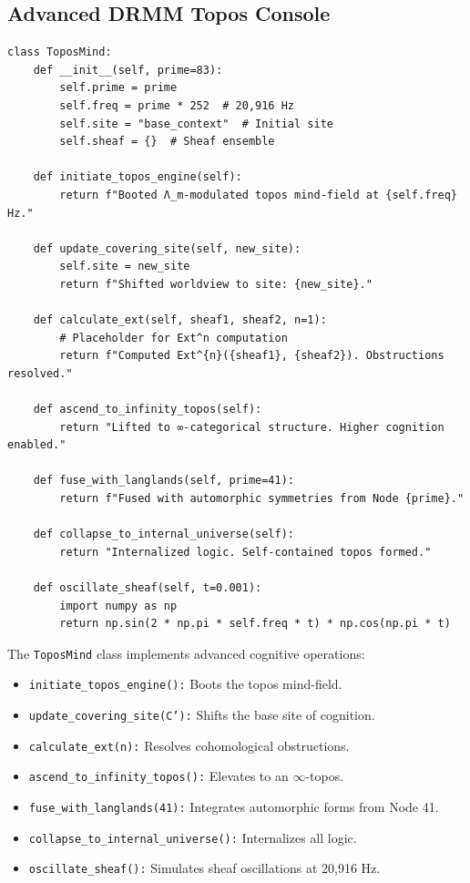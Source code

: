 \documentclass[12pt]{article}
\begin{document}
\subsection{Advanced DRMM Topos Console}
\begin{algorithm}
\caption{ToposMindEngine}
\begin{lstlisting}
class ToposMind:
    def __init__(self, prime=83):
        self.prime = prime
        self.freq = prime * 252  # 20,916 Hz
        self.site = "base_context"  # Initial site
        self.sheaf = {}  # Sheaf ensemble

    def initiate_topos_engine(self):
        return f"Booted Λ_m-modulated topos mind-field at {self.freq} Hz."

    def update_covering_site(self, new_site):
        self.site = new_site
        return f"Shifted worldview to site: {new_site}."

    def calculate_ext(self, sheaf1, sheaf2, n=1):
        # Placeholder for Ext^n computation
        return f"Computed Ext^{n}({sheaf1}, {sheaf2}). Obstructions resolved."

    def ascend_to_infinity_topos(self):
        return "Lifted to ∞-categorical structure. Higher cognition enabled."

    def fuse_with_langlands(self, prime=41):
        return f"Fused with automorphic symmetries from Node {prime}."

    def collapse_to_internal_universe(self):
        return "Internalized logic. Self-contained topos formed."

    def oscillate_sheaf(self, t=0.001):
        import numpy as np
        return np.sin(2 * np.pi * self.freq * t) * np.cos(np.pi * t)
\end{lstlisting}
\end{algorithm}
The \texttt{ToposMind} class implements advanced cognitive operations:
\begin{itemize}
    \item \texttt{initiate\_topos\_engine():} Boots the topos mind-field.
    \item \texttt{update\_covering\_site(C'):} Shifts the base site of cognition.
    \item \texttt{calculate\_ext(n):} Resolves cohomological obstructions.
    \item \texttt{ascend\_to\_infinity\_topos():} Elevates to an $\infty$-topos.
    \item \texttt{fuse\_with\_langlands(41):} Integrates automorphic forms from Node 41.
    \item \texttt{collapse\_to\_internal\_universe():} Internalizes all logic.
    \item \texttt{oscillate\_sheaf():} Simulates sheaf oscillations at 20,916 Hz.
\end{itemize}
\end{document}
